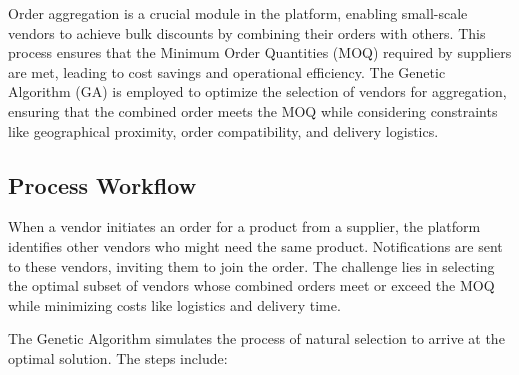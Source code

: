 Order aggregation is a crucial module in the platform, enabling small-scale vendors to achieve bulk discounts by combining their orders with others. This process ensures that the Minimum Order Quantities (MOQ) required by suppliers are met, leading to cost savings and operational efficiency. The Genetic Algorithm (GA) is employed to optimize the selection of vendors for aggregation, ensuring that the combined order meets the MOQ while considering constraints like geographical proximity, order compatibility, and delivery logistics.

\subsection{Process Workflow}

When a vendor initiates an order for a product from a supplier, the platform identifies other vendors who might need the same product. Notifications are sent to these vendors, inviting them to join the order. The challenge lies in selecting the optimal subset of vendors whose combined orders meet or exceed the MOQ while minimizing costs like logistics and delivery time.

The Genetic Algorithm simulates the process of natural selection to arrive at the optimal solution. The steps include:

